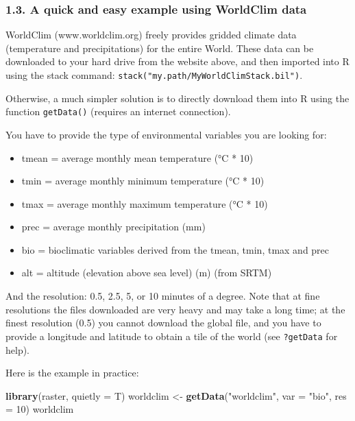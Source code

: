 \documentclass[]{article}
\newenvironment{Shaded}{\begin{snugshade}}{\end{snugshade}}
\newcommand{\KeywordTok}[1]{\textcolor[rgb]{0.13,0.29,0.53}{\textbf{#1}}}
\newcommand{\DataTypeTok}[1]{\textcolor[rgb]{0.13,0.29,0.53}{#1}}
\newcommand{\DecValTok}[1]{\textcolor[rgb]{0.00,0.00,0.81}{#1}}
\newcommand{\StringTok}[1]{\textcolor[rgb]{0.31,0.60,0.02}{#1}}
\newcommand{\NormalTok}[1]{#1}
\providecommand{\tightlist}{%
  \setlength{\itemsep}{0pt}\setlength{\parskip}{0pt}}
\begin{document}
\subsubsection{1.3. A quick and easy example using WorldClim
data}\label{a-quick-and-easy-example-using-worldclim-data}

WorldClim (www.worldclim.org) freely provides gridded climate data
(temperature and precipitations) for the entire World. These data can be
downloaded to your hard drive from the website above, and then imported
into R using the stack command:
\texttt{stack("my.path/MyWorldClimStack.bil")}.

Otherwise, a much simpler solution is to directly download them into R
using the function \texttt{getData()} (requires an internet connection).

You have to provide the type of environmental variables you are looking
for:

\begin{itemize}
\tightlist
\item
  tmean = average monthly mean temperature (°C * 10)
\item
  tmin = average monthly minimum temperature (°C * 10)
\item
  tmax = average monthly maximum temperature (°C * 10)
\item
  prec = average monthly precipitation (mm)
\item
  bio = bioclimatic variables derived from the tmean, tmin, tmax and
  prec
\item
  alt = altitude (elevation above sea level) (m) (from SRTM)
\end{itemize}

And the resolution: 0.5, 2.5, 5, or 10 minutes of a degree. Note that at
fine resolutions the files downloaded are very heavy and may take a long
time; at the finest resolution (0.5) you cannot download the global
file, and you have to provide a longitude and latitude to obtain a tile
of the world (see \texttt{?getData} for help).

Here is the example in practice:

\begin{Shaded}
\begin{Highlighting}[]
\KeywordTok{library}\NormalTok{(raster, }\DataTypeTok{quietly =}\NormalTok{ T)}
\NormalTok{worldclim <-}\StringTok{ }\KeywordTok{getData}\NormalTok{(}\StringTok{"worldclim"}\NormalTok{, }\DataTypeTok{var =} \StringTok{"bio"}\NormalTok{, }\DataTypeTok{res =} \DecValTok{10}\NormalTok{)}
\NormalTok{worldclim}
\end{Highlighting}
\end{Shaded}
\end{document}
